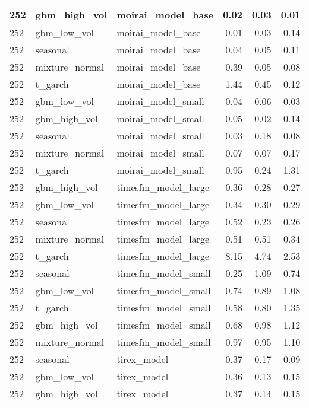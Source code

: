 {\begin{tabular}{lllrrr}
\midrule
252 & gbm\_high\_vol & moirai\_model\_base & 0.02 & 0.03 & 0.01 \\
\midrule
252 & gbm\_low\_vol & moirai\_model\_base & 0.01 & 0.03 & 0.14 \\
\midrule
252 & seasonal & moirai\_model\_base & 0.04 & 0.05 & 0.11 \\
\midrule
252 & mixture\_normal & moirai\_model\_base & 0.39 & 0.05 & 0.08 \\
\midrule
252 & t\_garch & moirai\_model\_base & 1.44 & 0.45 & 0.12 \\
\midrule
252 & gbm\_low\_vol & moirai\_model\_small & 0.04 & 0.06 & 0.03 \\
\midrule
252 & gbm\_high\_vol & moirai\_model\_small & 0.05 & 0.02 & 0.14 \\
\midrule
252 & seasonal & moirai\_model\_small & 0.03 & 0.18 & 0.08 \\
\midrule
252 & mixture\_normal & moirai\_model\_small & 0.07 & 0.07 & 0.17 \\
\midrule
252 & t\_garch & moirai\_model\_small & 0.95 & 0.24 & 1.31 \\
\midrule
252 & gbm\_high\_vol & timesfm\_model\_large & 0.36 & 0.28 & 0.27 \\
\midrule
252 & gbm\_low\_vol & timesfm\_model\_large & 0.34 & 0.30 & 0.29 \\
\midrule
252 & seasonal & timesfm\_model\_large & 0.52 & 0.23 & 0.26 \\
\midrule
252 & mixture\_normal & timesfm\_model\_large & 0.51 & 0.51 & 0.34 \\
\midrule
252 & t\_garch & timesfm\_model\_large & 8.15 & 4.74 & 2.53 \\
\midrule
252 & seasonal & timesfm\_model\_small & 0.25 & 1.09 & 0.74 \\
\midrule
252 & gbm\_low\_vol & timesfm\_model\_small & 0.74 & 0.89 & 1.08 \\
\midrule
252 & t\_garch & timesfm\_model\_small & 0.58 & 0.80 & 1.35 \\
\midrule
252 & gbm\_high\_vol & timesfm\_model\_small & 0.68 & 0.98 & 1.12 \\
\midrule
252 & mixture\_normal & timesfm\_model\_small & 0.97 & 0.95 & 1.10 \\
\midrule
252 & seasonal & tirex\_model & 0.37 & 0.17 & 0.09 \\
\midrule
252 & gbm\_low\_vol & tirex\_model & 0.36 & 0.13 & 0.15 \\
\midrule
252 & gbm\_high\_vol & tirex\_model & 0.37 & 0.14 & 0.15 \\

\end{tabular}}
